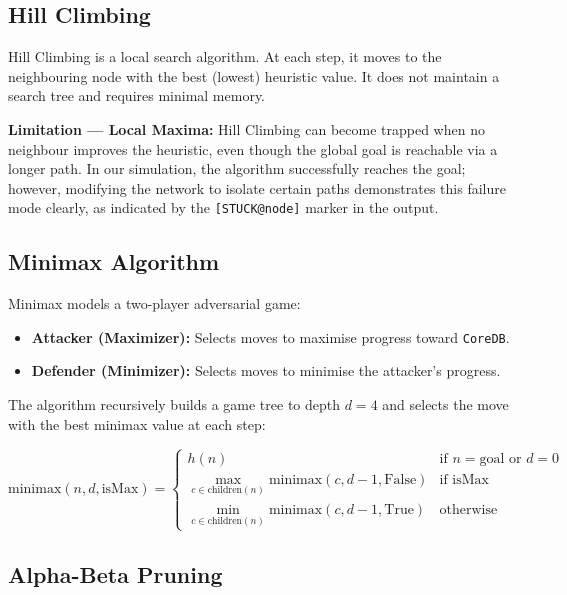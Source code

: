 \documentclass[12pt,a4paper]{article}
\begin{document}
\subsection{Hill Climbing}

Hill Climbing is a local search algorithm. At each step, it moves to the neighbouring
node with the best (lowest) heuristic value. It does not maintain a search tree and
requires minimal memory.

\textbf{Limitation --- Local Maxima:} Hill Climbing can become trapped when no
neighbour improves the heuristic, even though the global goal is reachable via a
longer path. In our simulation, the algorithm successfully reaches the goal; however,
modifying the network to isolate certain paths demonstrates this failure mode clearly,
as indicated by the \texttt{[STUCK@node]} marker in the output.

\subsection{Minimax Algorithm}

Minimax models a two-player adversarial game:
\begin{itemize}
    \item \textbf{Attacker (Maximizer):} Selects moves to maximise progress toward \texttt{CoreDB}.
    \item \textbf{Defender (Minimizer):} Selects moves to minimise the attacker's progress.
\end{itemize}

The algorithm recursively builds a game tree to depth $d = 4$ and selects the move
with the best minimax value at each step:

\begin{equation}
    \text{minimax}(n, d, \text{isMax}) =
    \begin{cases}
        h(n) & \text{if } n = \text{goal or } d = 0 \\
        \max_{c \in \text{children}(n)} \text{minimax}(c, d-1, \text{False}) & \text{if isMax} \\
        \min_{c \in \text{children}(n)} \text{minimax}(c, d-1, \text{True}) & \text{otherwise}
    \end{cases}
\end{equation}

\subsection{Alpha-Beta Pruning}
\end{document}
